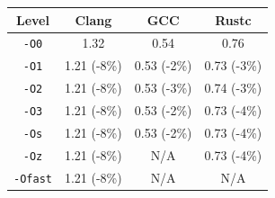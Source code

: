 \begin{tabular*}{\columnwidth}{@{\extracolsep\fill}cccc@{\extracolsep\fill}}
\toprule
\textbf{Level} & \textbf{Clang} & \textbf{GCC} & \textbf{Rustc} \\
\midrule
\texttt{-O0} & 1.32 & 0.54 & 0.76 \\
\texttt{-O1} & 1.21 (-8\%) & 0.53 (-2\%) & 0.73 (-3\%) \\
\texttt{-O2} & 1.21 (-8\%) & 0.53 (-3\%) & 0.74 (-3\%) \\
\texttt{-O3} & 1.21 (-8\%) & 0.53 (-2\%) & 0.73 (-4\%) \\
\texttt{-Os} & 1.21 (-8\%) & 0.53 (-2\%) & 0.73 (-4\%) \\
\texttt{-Oz} & 1.21 (-8\%) & N/A & 0.73 (-4\%) \\
\texttt{-Ofast} & 1.21 (-8\%) & N/A & N/A \\
\bottomrule
\end{tabular*}
